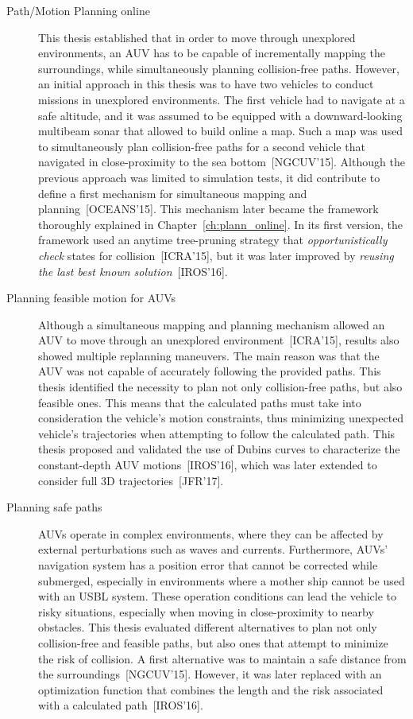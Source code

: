 \begin{description}

\item[Path/Motion Planning online] This thesis established that in order to move
through unexplored environments, an \ac{AUV} has to be capable of incrementally
mapping the surroundings, while simultaneously planning collision-free paths.
However, an initial approach in this thesis was to have two vehicles to conduct
missions in unexplored environments. The first vehicle had to navigate at a safe
altitude, and it was assumed to be equipped with a downward-looking multibeam
sonar that allowed to build online a map. Such a map was used to simultaneously
plan collision-free paths for a second vehicle that navigated in close-proximity
to the sea bottom~[NGCUV'15]. Although the previous approach was limited to
simulation tests, it did contribute to define a first mechanism for simultaneous
mapping and planning~[OCEANS'15]. This mechanism later became the framework
thoroughly explained in Chapter~\ref{ch:plann_online}. In its first version, the
framework used an anytime tree-pruning strategy that \textit{opportunistically
check} states for collision~[ICRA'15], but it was later improved by
\textit{reusing the last best known solution}~[IROS'16].

\item[Planning feasible motion for AUVs] Although a simultaneous mapping and
planning mechanism allowed an \ac{AUV} to move through an unexplored
environment~[ICRA'15], results also showed multiple replanning maneuvers.
The main reason was that the \ac{AUV} was not capable of accurately following
the provided paths. This thesis identified the necessity to plan not only
collision-free paths, but also feasible ones. This means that the calculated
paths must take into consideration the vehicle's motion constraints, thus
minimizing unexpected vehicle's trajectories when attempting to follow the
calculated path. This thesis proposed and validated the use of Dubins curves to
characterize the constant-depth \ac{AUV} motions~[IROS'16], which was later
extended to consider full \ac{3D} trajectories~[JFR'17].

\item[Planning safe paths] \acp{AUV} operate in complex environments, where
they can be affected by external perturbations such as waves and currents.
Furthermore, \acp{AUV}' navigation system has a position error that cannot be
corrected while submerged, especially in environments where a mother ship
cannot be used with an \ac{USBL} system. These operation conditions can lead the
vehicle to risky situations, especially when moving in close-proximity to nearby
obstacles. This thesis evaluated different alternatives to plan not only
collision-free and feasible paths, but also ones that attempt to minimize the
risk of collision. A first alternative was to maintain a safe distance from the
surroundings~[NGCUV'15]. However, it was later replaced with an optimization
function that combines the length and the risk associated with a calculated
path~[IROS'16].


\end{description}
